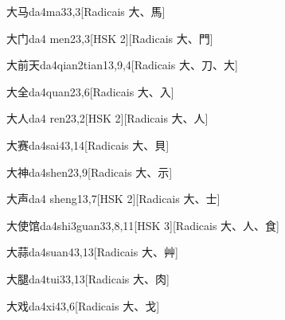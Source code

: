 \begin{entry}{大马}{da4ma3}{3,3}[Radicais ⼤、⾺]
\end{entry}

\begin{entry}{大门}{da4 men2}{3,3}[HSK 2][Radicais ⼤、⾨]
\end{entry}

\begin{entry}{大前天}{da4qian2tian1}{3,9,4}[Radicais ⼤、⼑、⼤]
\end{entry}

\begin{entry}{大全}{da4quan2}{3,6}[Radicais ⼤、⼊]
\end{entry}

\begin{entry}{大人}{da4 ren2}{3,2}[HSK 2][Radicais ⼤、⼈]
\end{entry}

\begin{entry}{大赛}{da4sai4}{3,14}[Radicais ⼤、⾙]
\end{entry}

\begin{entry}{大神}{da4shen2}{3,9}[Radicais ⼤、⽰]
\end{entry}

\begin{entry}{大声}{da4 sheng1}{3,7}[HSK 2][Radicais ⼤、⼠]
\end{entry}

\begin{entry}{大使馆}{da4shi3guan3}{3,8,11}[HSK 3][Radicais ⼤、⼈、⾷]
\end{entry}

\begin{entry}{大蒜}{da4suan4}{3,13}[Radicais ⼤、⾋]
\end{entry}

\begin{entry}{大腿}{da4tui3}{3,13}[Radicais ⼤、⾁]
\end{entry}

\begin{entry}{大戏}{da4xi4}{3,6}[Radicais ⼤、⼽]
\end{entry}

